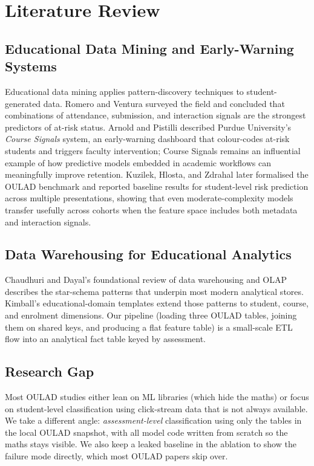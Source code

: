 \documentclass[conference]{IEEEtran}
\begin{document}
\section{Literature Review}
\subsection{Educational Data Mining and Early-Warning Systems}
Educational data mining applies pattern-discovery techniques to student-generated data. Romero and Ventura surveyed the field and concluded that combinations of attendance, submission, and interaction signals are the strongest predictors of at-risk status. Arnold and Pistilli described Purdue University's \emph{Course Signals} system, an early-warning dashboard that colour-codes at-risk students and triggers faculty intervention; Course Signals remains an influential example of how predictive models embedded in academic workflows can meaningfully improve retention. Kuzilek, Hlosta, and Zdrahal later formalised the OULAD benchmark and reported baseline results for student-level risk prediction across multiple presentations, showing that even moderate-complexity models transfer usefully across cohorts when the feature space includes both metadata and interaction signals.

\subsection{Data Warehousing for Educational Analytics}
Chaudhuri and Dayal's foundational review of data warehousing and OLAP describes the star-schema patterns that underpin most modern analytical stores. Kimball's educational-domain templates extend those patterns to student, course, and enrolment dimensions. Our pipeline (loading three OULAD tables, joining them on shared keys, and producing a flat feature table) is a small-scale ETL flow into an analytical fact table keyed by assessment.

\subsection{Research Gap}
Most OULAD studies either lean on ML libraries (which hide the maths) or focus on student-level classification using click-stream data that is not always available. We take a different angle: \emph{assessment-level} classification using only the tables in the local OULAD snapshot, with all model code written from scratch so the maths stays visible. We also keep a leaked baseline in the ablation to show the failure mode directly, which most OULAD papers skip over.
\end{document}
